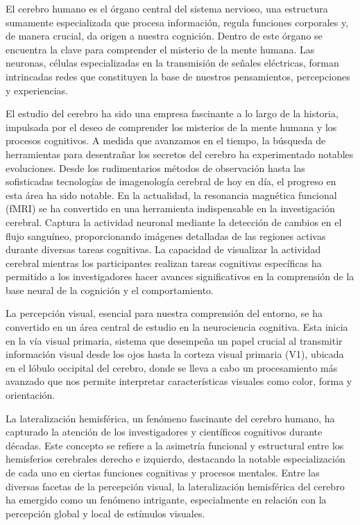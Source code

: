 \documentclass{article}
\begin{document}
	
	El cerebro humano es el órgano central del sistema nervioso, una estructura sumamente especializada que procesa información, regula funciones corporales y, de manera crucial, da origen a nuestra cognición. Dentro de este órgano se encuentra la clave para comprender el misterio de la mente humana. Las neuronas, células especializadas en la transmisión de señales eléctricas, forman intrincadas redes que constituyen la base de nuestros pensamientos, percepciones y experiencias.
	
	El estudio del cerebro ha sido una empresa fascinante a lo largo de la historia, impulsada por el deseo de comprender los misterios de la mente humana y los procesos cognitivos. A medida que avanzamos en el tiempo, la búsqueda de herramientas para desentrañar los secretos del cerebro ha experimentado notables evoluciones. Desde los rudimentarios métodos de observación hasta las sofisticadas tecnologías de imagenología cerebral de hoy en día, el progreso en esta área ha sido notable. En la actualidad, la resonancia magnética funcional (fMRI) se ha convertido en una herramienta indispensable en la investigación cerebral. Captura la actividad neuronal mediante la detección de cambios en el flujo sanguíneo, proporcionando imágenes detalladas de las regiones activas durante diversas tareas cognitivas. La capacidad de visualizar la actividad cerebral mientras los participantes realizan tareas cognitivas específicas ha permitido a los investigadores hacer avances significativos en la comprensión de la base neural de la cognición y el comportamiento.
	
	La percepción visual, esencial para nuestra comprensión del entorno, se ha convertido en un área central de estudio en la neurociencia cognitiva. Esta inicia en la vía visual primaria, sistema que desempeña un papel crucial al transmitir información visual desde los ojos hasta la corteza visual primaria (V1), ubicada en el lóbulo occipital del cerebro, donde se lleva a cabo un procesamiento más avanzado que nos permite interpretar características visuales como color, forma y orientación.
	
	La lateralización hemisférica, un fenómeno fascinante del cerebro humano, ha capturado la atención de los investigadores y científicos cognitivos durante décadas. Este concepto se refiere a la asimetría funcional y estructural entre los hemisferios cerebrales derecho e izquierdo, destacando la notable especialización de cada uno en ciertas funciones cognitivas y procesos mentales. Entre las diversas facetas de la percepción visual, la lateralización hemisférica del cerebro ha emergido como un fenómeno intrigante, especialmente en relación con la percepción global y local de estímulos visuales.
	
\end{document}
